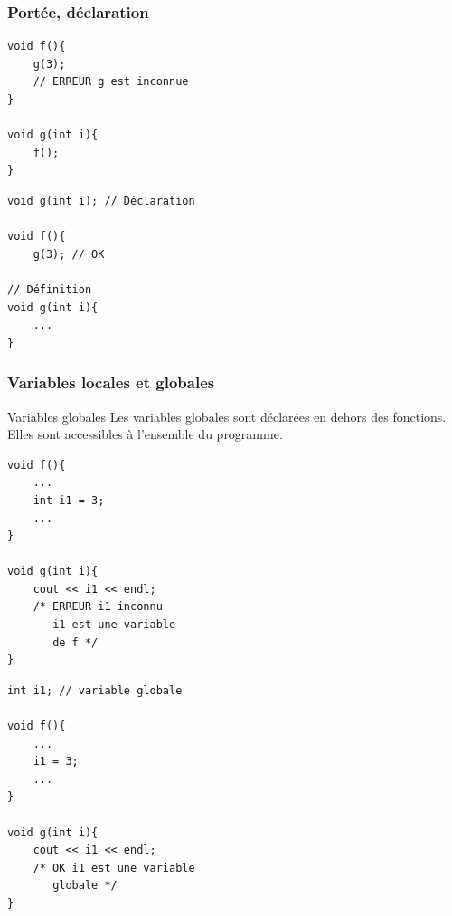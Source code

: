 \begin{frame}[fragile]
	\frametitle{Portée, déclaration}

	\begin{minipage}{0.47\linewidth}
		\begin{verbatim}
void f(){
    g(3);
    // ERREUR g est inconnue
}

void g(int i){
    f();
}
		\end{verbatim}
	\end{minipage}
	\hfill
	\begin{minipage}{0.47\linewidth}

		\begin{verbatim}
void g(int i); // Déclaration

void f(){
    g(3); // OK

// Définition
void g(int i){
    ...
}
		\end{verbatim}
	\end{minipage}
\end{frame}

\begin{frame}[fragile]
	\frametitle{Variables locales et globales}

	\begin{block}{Variables globales}
		Les variables globales sont déclarées en dehors des fonctions.
		Elles sont accessibles à l'ensemble du programme.
	\end{block}

	\begin{minipage}{0.47\linewidth}
		\begin{verbatim}
void f(){
    ...
    int i1 = 3;
    ...
}

void g(int i){
    cout << i1 << endl;
    /* ERREUR i1 inconnu
       i1 est une variable
       de f */
}
		\end{verbatim}
	\end{minipage}
	\hfill
	\begin{minipage}{0.47\linewidth}

		\begin{verbatim}
int i1; // variable globale

void f(){
    ...
    i1 = 3;
    ...
}

void g(int i){
    cout << i1 << endl;
    /* OK i1 est une variable
       globale */
}
		\end{verbatim}
	\end{minipage}

\end{frame}


